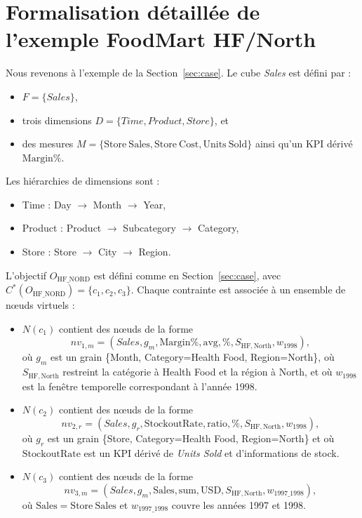 \documentclass[journal]{IEEEtran}
\begin{document}
\section{Formalisation détaillée de l'exemple FoodMart HF/North}
\label{app:foodmart}

Nous revenons à l'exemple de la Section~\ref{sec:case}. Le cube \textit{Sales} est défini par :
\begin{itemize}
  \item $F=\{\textit{Sales}\}$,
  \item trois dimensions $D=\{\textit{Time},\textit{Product},\textit{Store}\}$, et
  \item des mesures $M=\{\mathrm{Store\ Sales},\mathrm{Store\ Cost},\mathrm{Units\ Sold}\}$ ainsi qu'un KPI dérivé $\mathrm{Margin\%}$.
\end{itemize}

Les hiérarchies de dimensions sont :
\begin{itemize}
  \item Time : Day $\rightarrow$ Month $\rightarrow$ Year,
  \item Product : Product $\rightarrow$ Subcategory $\rightarrow$ Category,
  \item Store : Store $\rightarrow$ City $\rightarrow$ Region.
\end{itemize}

L'objectif $O_{\mathrm{HF\_NORD}}$ est défini comme en Section~\ref{sec:case}, avec $C^*(O_{\mathrm{HF\_NORD}})=\{c_1,c_2,c_3\}$. Chaque contrainte est associée à un ensemble de nœuds virtuels :
\begin{itemize}
  \item $N(c_1)$ contient des nœuds de la forme
  \[
  nv_{1,m}=(\textit{Sales},g_m,\mathrm{Margin\%},\mathrm{avg},\%,S_{\mathrm{HF,North}},w_{1998}),
  \]
  où $g_m$ est un grain \{Month, Category=Health Food, Region=North\}, où $S_{\mathrm{HF,North}}$ restreint la catégorie à Health Food et la région à North, et où $w_{1998}$ est la fenêtre temporelle correspondant à l'année 1998.
  \item $N(c_2)$ contient des nœuds de la forme
  \[
  nv_{2,r}=(\textit{Sales},g_r,\mathrm{StockoutRate},\mathrm{ratio},\%,S_{\mathrm{HF,North}},w_{1998}),
  \]
  où $g_r$ est un grain \{Store, Category=Health Food, Region=North\} et où $\mathrm{StockoutRate}$ est un KPI dérivé de \textit{Units Sold} et d'informations de stock.
  \item $N(c_3)$ contient des nœuds de la forme
  \[
  nv_{3,m}=(\textit{Sales},g_m,\mathrm{Sales},\mathrm{sum},\text{USD},S_{\mathrm{HF,North}},w_{1997\_1998}),
  \]
  où $\mathrm{Sales}=\mathrm{Store\ Sales}$ et $w_{1997\_1998}$ couvre les années 1997 et 1998.
\end{itemize}
\end{document}

